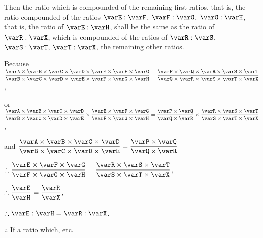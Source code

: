 \documentclass[booklanguage=english]{byrnebook}
\begin{document}
Then the ratio which is compounded of the remaining first ratios, that is, the ratio compounded of the ratios $\varE : \varF$, $\varF : \varG$, $\varG : \varH$, that is, the ratio of $\varE : \varH$, shall be the same as the ratio of $\varR : \varX$, which is compounded of the ratios of $\varR : \varS$, $\varS : \varT$, $\varT : \varX$, the remaining other ratios.

\begin{center}
Because $\dfrac
{\varA \times \varB \times \varC \times \varD \times \varE \times \varF \times \varG}
{\varB \times \varC \times \varD \times \varE \times \varF \times \varG \times \varH} =
\dfrac
{\varP \times \varQ \times \varR \times \varS \times \varT}
{\varQ \times \varR \times \varS \times \varT \times \varX}$,

or $\dfrac
{\varA \times \varB \times \varC \times \varD}
{\varB \times \varC \times \varD \times \varE}
\times
\dfrac
{\varE \times \varF \times \varG}
{\varF \times \varG \times \varH} =
\dfrac
{\varP \times \varQ}
{\varQ \times \varR}
\times
\dfrac
{\varR \times \varS \times \varT}
{\varS \times \varT \times \varX}$,

and $\dfrac
{\varA \times \varB \times \varC \times \varD}
{\varB \times \varC \times \varD \times \varE} =
\dfrac
{\varP \times \varQ}
{\varQ \times \varR}$

$\therefore \dfrac
{\varE \times \varF \times \varG}
{\varF \times \varG \times \varH} =
\dfrac
{\varR \times \varS \times \varT}
{\varS \times \varT \times \varX}$,

$\therefore \dfrac{\varE}{\varH} = \dfrac{\varR}{\varX}$,

$\therefore \varE : \varH = \varR : \varX$.

$\therefore$ If a ratio which, etc.
\end{center}
\vfill\pagebreak
\end{document}
